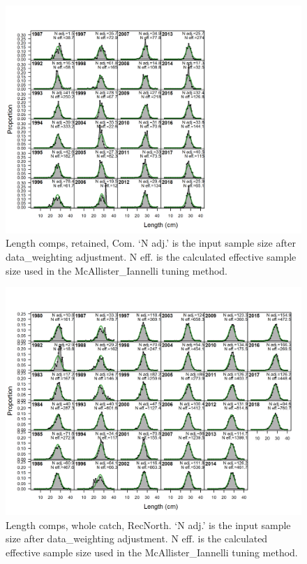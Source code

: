 \documentclass[12pt,]{article}
\begin{document}
\begin{figure}
\centering
\includegraphics{./r4ss/plots_mod1/comp_lenfit_flt1mkt2.png}
\caption{Length comps, retained, Com. `N adj.' is the input sample size
after data\_weighting adjustment. N eff. is the calculated effective
sample size used in the McAllister\_Iannelli tuning method.
\label{fig:mod1_1_comp_lenfit_flt1mkt2}}
\end{figure}

\begin{figure}
\centering
\includegraphics{./r4ss/plots_mod1/comp_lenfit_flt2mkt0.png}
\caption{Length comps, whole catch, RecNorth. `N adj.' is the input
sample size after data\_weighting adjustment. N eff. is the calculated
effective sample size used in the McAllister\_Iannelli tuning method.
\label{fig:mod1_2_comp_lenfit_flt2mkt0}}
\end{figure}
\end{document}
